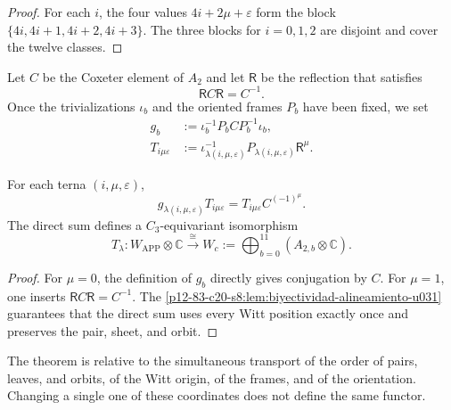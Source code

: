 \begin{proof}
For each \(i\), the four values \(4i+2\mu+\varepsilon\) form the block
\(\{4i,4i+1,4i+2,4i+3\}\). The three blocks for \(i=0,1,2\) are disjoint
and cover the twelve classes.
\end{proof}

Let \(C\) be the Coxeter element of \(A_2\) and let \(\mathsf R\) be the reflection that
satisfies
\begin{equation}
 \mathsf R C\mathsf R=C^{-1}.
 \label{p12-83-c20-s8:eq:reflexion-conjuga-coxeter-u031}
\end{equation}
Once the trivializations \(\iota_b\) and the oriented frames \(P_b\) have been fixed,
we set
\begin{align}
 g_b&:=\iota_b^{-1}P_bCP_b^{-1}\iota_b,
 \label{p12-83-c20-s8:eq:coxeter-calibrado-fibra-u031}\\
 T_{i\mu\varepsilon}
 &:=\iota_{\lambda(i,\mu,\varepsilon)}^{-1}
 P_{\lambda(i,\mu,\varepsilon)}\mathsf R^\mu.
 \label{p12-83-c20-s8:eq:entrelazador-fibra-u031}
\end{align}

\begin{theorem}
\label{p12-83-c20-s8:thm:alineamiento-app-witt-u031}
For each terna \((i,\mu,\varepsilon)\),
\begin{equation}
 g_{\lambda(i,\mu,\varepsilon)}T_{i\mu\varepsilon}
 =T_{i\mu\varepsilon}C^{(-1)^\mu}.
 \label{p12-83-c20-s8:eq:identidad-entrelazamiento-app-witt-u031}
\end{equation}
The direct sum defines a \(C_3\)-equivariant isomorphism
\begin{equation}
 T_\lambda:
 W_{\mathrm{APP}}\otimes\mathbb C
 \xrightarrow{\;\cong\;}
 W_c:=\bigoplus_{b=0}^{11}
 (A_{2,b}\otimes\mathbb C).
 \label{p12-83-c20-s8:eq:isomorfismo-app-witt-u031}
\end{equation}
\end{theorem}

\begin{proof}
For \(\mu=0\), the definition of \(g_b\) directly gives conjugation
by \(C\). For \(\mu=1\), one inserts
\(\mathsf RC\mathsf R=C^{-1}\). The
\cref{p12-83-c20-s8:lem:biyectividad-alineamiento-u031} guarantees that the direct sum
uses every Witt position exactly once and preserves the pair, sheet, and orbit.
\end{proof}

The theorem is relative to the simultaneous transport of the order of pairs, leaves, and
orbits, of the Witt origin, of the frames, and of the orientation. Changing a
single one of these coordinates does not define the same functor.

